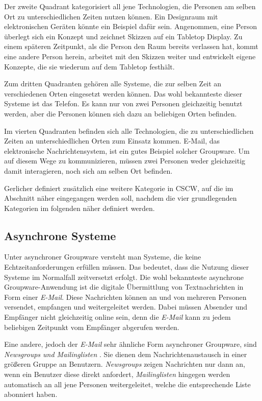 Der zweite Quadrant kategorisiert all jene Technologien, die Personen am selben Ort zu unterschiedlichen Zeiten nutzen können. Ein Designraum mit elektronischen Geräten könnte ein Beispiel dafür sein. Angenommen, eine Person überlegt sich ein Konzept und zeichnet Skizzen auf ein Tabletop Display. Zu einem späteren Zeitpunkt, als die Person den Raum bereits verlassen hat, kommt eine andere Person herein, arbeitet mit den Skizzen weiter und entwickelt eigene Konzepte, die sie wiederum auf dem Tabletop festhält. 

Zum dritten Quadranten gehören alle Systeme, die zur selben Zeit an verschiedenen Orten eingesetzt werden können. Das wohl bekannteste dieser Systeme ist das Telefon. Es kann nur von zwei Personen gleichzeitig benutzt werden, aber die Personen können sich dazu an beliebigen Orten befinden.

Im vierten Quadranten befinden sich alle Technologien, die zu unterschiedlichen Zeiten an unterschiedlichen Orten zum Einsatz kommen. E-Mail, das elektronische Nachrichtensystem, ist ein gutes Beispiel solcher Groupware. Um auf diesem Wege zu kommunizieren, müssen zwei Personen weder gleichzeitig damit interagieren, noch sich am selben Ort befinden. 

\medskip Gerlicher definiert zusätzlich eine weitere Kategorie in \ac{CSCW}, auf die im Abschnitt  näher eingegangen werden soll, nachdem die vier grundlegenden Kategorien im folgenden näher definiert werden.

\clearpage
\subsection{Asynchrone Systeme} 

Unter asynchroner Groupware versteht man Systeme, die keine Echtzeitanforderungen erfüllen müssen. Das bedeutet, dass die Nutzung dieser Systeme im Normalfall zeitversetzt erfolgt. Die wohl bekannteste asynchrone Groupware-Anwendung ist die digitale Übermittlung von Textnachrichten in Form einer \emph{E-Mail}. Diese Nachrichten können an und von mehreren Personen versendet, empfangen und weitergeleitet werden. Dabei müssen Absender und Empfänger nicht gleichzeitig online sein, denn die \emph{E-Mail} kann zu jedem beliebigen Zeitpunkt vom Empfänger abgerufen werden.

Eine andere, jedoch der \emph{E-Mail} sehr ähnliche Form asynchroner Groupware, sind \emph{Newsgroups und Mailinglisten} \citep{Gerlicher:2007p241}. Sie dienen dem Nachrichtenaustausch in einer größeren Gruppe an Benutzern. \emph{Newsgroups} zeigen Nachrichten nur dann an, wenn ein Benutzer diese direkt anfordert, \emph{Mailinglisten} hingegen werden automatisch an all jene Personen weitergeleitet, welche die entsprechende Liste abonniert haben.

